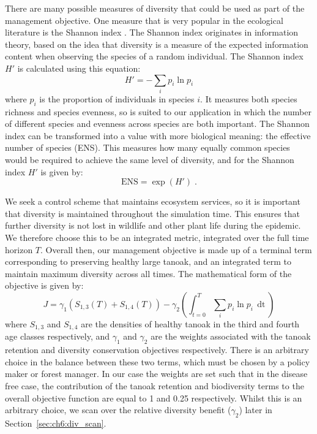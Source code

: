 There are many possible measures of diversity that could be used as part of the management objective. One measure that is very popular in the ecological literature is the Shannon index \citep[][pp.\ 106--108]{magurran_measuring_2013}. The Shannon index originates in information theory, based on the idea that diversity is a measure of the expected information content when observing the species of a random individual. The Shannon index $H'$ is calculated using this equation:
\begin{equation}\label{eqn:ch6:shannon_idx}
    H' = -\sum_ip_i\ln{p_i}
\end{equation}
where $p_i$ is the proportion of individuals in species $i$. It measures both species richness and species evenness, so is suited to our application in which the number of different species and evenness across species are both important. The Shannon index can be transformed into a value with more biological meaning: the effective number of species (ENS). This measures how many equally common species would be required to achieve the same level of diversity, and for the Shannon index $H'$ is given by:
\begin{equation}\label{eqn:ch6:shannon_ens}
    \textrm{ENS} = \exp(H')\;.
\end{equation}

We seek a control scheme that maintains ecosystem services, so it is important that diversity is maintained throughout the simulation time. This ensures that further diversity is not lost in wildlife and other plant life during the epidemic. We therefore choose this to be an integrated metric, integrated over the full time horizon $T$. Overall then, our management objective is made up of a terminal term corresponding to preserving healthy large tanoak, and an integrated term to maintain maximum diversity across all times. The mathematical form of the objective is given by:
\begin{equation}\label{eqn:ch6:mgmt_obj}
    J = \gamma_1\left(S_{1,3}(T) + S_{1,4}(T)\right) - \gamma_2\left(\int_{t=0}^T \sum_ip_i\ln{p_i}\,\mathop{dt}\right)
\end{equation}
where $S_{1,3}$ and $S_{1,4}$ are the densities of healthy tanoak in the third and fourth age classes respectively, and $\gamma_1$ and $\gamma_2$ are the weights associated with the tanoak retention and diversity conservation objectives respectively. There is an arbitrary choice in the balance between these two terms, which must be chosen by a policy maker or forest manager. In our case the weights are set such that in the disease free case, the contribution of the tanoak retention and biodiversity terms to the overall objective function are equal to 1 and 0.25 respectively. Whilst this is an arbitrary choice, we scan over the relative diversity benefit ($\gamma_2$) later in Section~\ref{sec:ch6:div_scan}.

